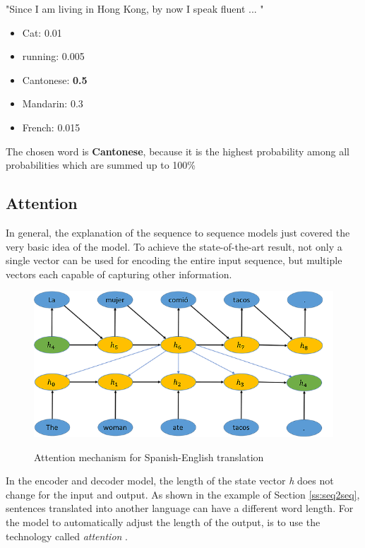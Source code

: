 \begin{tcolorbox}
	"Since I am living in Hong Kong, by now I speak fluent ... "
	
	\begin{itemize}
		\item Cat: 0.01
		\item running: 0.005
		\item Cantonese: \textbf{0.5}
		\item Mandarin: 0.3
		\item French: 0.015
	\end{itemize}

	The chosen word is \textbf{Cantonese}, because it is the highest probability among all probabilities which are summed up to 100\%
\end{tcolorbox}
 

\subsection{Attention}\label{ss:atten}
In general, the explanation of the sequence to sequence models just covered the very basic idea of the model. To achieve the state-of-the-art result, not only a single vector can be used for encoding the entire input sequence, but multiple vectors each capable of capturing other information. 

\begin{figure}
	\begin{center}
		\includegraphics[width=4.5in]{photos/w1-11}\\
		\caption{Attention mechanism for Spanish-English translation \cite{mugan}}\label{attention1}
	\end{center}
\end{figure}
In the encoder and decoder model, the length of the state vector \textit{h} does not change for the input and output. As shown in the example of Section \ref{ss:seq2seq}, sentences translated into another language can have a different word length. For the model to automatically adjust the length of the output, is to use the technology called \textit{attention} \cite{attention} \cite{attention2}.

